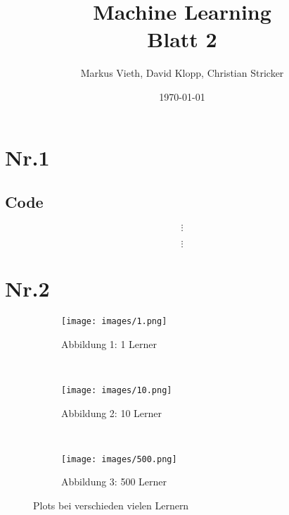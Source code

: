 \documentclass[a4paper,11pt,twoside]{article}
\title{Machine Learning\\ Blatt 2}
\author{Markus Vieth, David Klopp, Christian Stricker}
\date{\today}
\begin{document}
\newcommand{\cor}[1]{\textcolor{red}{\textit{#1}}}
\maketitle
\cleardoublepage
\pagestyle{myheadings}

\section*{Nr.1}
\subsection*{Code}

\[ \vdots \]

\[ \vdots \]


\newpage

\section*{Nr.2}
\begin{figure*}[t!]
	\centering
	\begin{subfigure}[t]{0.33\textwidth}
		\texttt{[image: images/1.png]}
		\caption{Abbildung 1: 1 Lerner}
	\end{subfigure}%
	~
	\begin{subfigure}[t]{0.33\textwidth}
		\texttt{[image: images/10.png]}
		\caption{Abbildung 2: 10 Lerner}
	\end{subfigure}%
	~
	\begin{subfigure}[t]{0.33\textwidth}
		\texttt{[image: images/500.png]}
		\caption{Abbildung 3: 500 Lerner}
	\end{subfigure}
	
	\caption*{Plots bei verschieden vielen Lernern}
\end{figure*}
\end{document}
